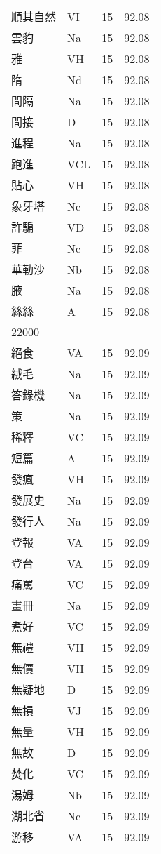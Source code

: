 \documentclass[twocolumn]{book}
\begin{document}
\begin{supertabular}{llrr}
順其自然 & VI & 15 &  92.08\\
雲豹 & Na & 15 &  92.08\\
雅 & VH & 15 &  92.08\\
隋 & Nd & 15 &  92.08\\
間隔 & Na & 15 &  92.08\\
間接 & D & 15 &  92.08\\
進程 & Na & 15 &  92.08\\
跑進 & VCL & 15 &  92.08\\
貼心 & VH & 15 &  92.08\\
象牙塔 & Nc & 15 &  92.08\\
詐騙 & VD & 15 &  92.08\\
菲 & Nc & 15 &  92.08\\
華勒沙 & Nb & 15 &  92.08\\
腋 & Na & 15 &  92.08\\
絲絲 & A & 15 &  92.08\\
22000\\
絕食 & VA & 15 &  92.09\\
絨毛 & Na & 15 &  92.09\\
答錄機 & Na & 15 &  92.09\\
策 & Na & 15 &  92.09\\
稀釋 & VC & 15 &  92.09\\
短篇 & A & 15 &  92.09\\
發瘋 & VH & 15 &  92.09\\
發展史 & Na & 15 &  92.09\\
發行人 & Na & 15 &  92.09\\
登報 & VA & 15 &  92.09\\
登台 & VA & 15 &  92.09\\
痛罵 & VC & 15 &  92.09\\
畫冊 & Na & 15 &  92.09\\
煮好 & VC & 15 &  92.09\\
無禮 & VH & 15 &  92.09\\
無價 & VH & 15 &  92.09\\
無疑地 & D & 15 &  92.09\\
無損 & VJ & 15 &  92.09\\
無量 & VH & 15 &  92.09\\
無故 & D & 15 &  92.09\\
焚化 & VC & 15 &  92.09\\
湯姆 & Nb & 15 &  92.09\\
湖北省 & Nc & 15 &  92.09\\
游移 & VA & 15 &  92.09\\

\end{supertabular}
\end{document}
